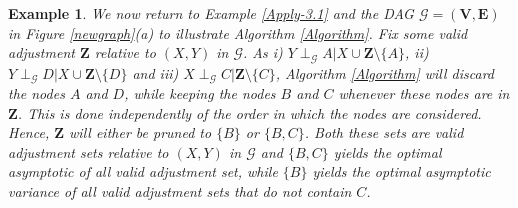 \documentclass[11pt,a4paper]{article}
\newtheorem{Example}[Satz]{Example}
\theoremstyle{definition}
\theoremstyle{remark}
\newcommand{\g}[1][G]{\mathcal{#1}}
\begin{document}

\begin{Example}
	
	We now return to Example \ref{Apply-3.1} and the DAG $\g = (\mathbf{V},\mathbf{E})$ in Figure \ref{newgraph}(a) to illustrate Algorithm \ref{Algorithm}. Fix some valid adjustment $\mathbf{Z}$ relative to $(X,Y)$ in $\g$. As i) $Y \perp_{\g} A | X \cup \mathbf{Z} \setminus \{A\}$, ii) $Y \perp_{\g} D | X \cup \mathbf{Z} \setminus \{D\}$  and iii) $X \perp_{\g} C | \mathbf{Z} \setminus \{C\}$, Algorithm \ref{Algorithm} will discard the nodes $A$ and $D$, while keeping the nodes $B$ and $C$ whenever these nodes are in $\mathbf{Z}$. This is done independently of the order in which the nodes are considered. Hence, $\mathbf{Z}$ will either be pruned to $\{B\}$ or $\{B,C\}$. Both these sets are valid adjustment sets relative to $(X,Y)$ in $\g$ and $\{B,C\}$ yields the optimal asymptotic of all valid adjustment set, while $\{B\}$ yields the optimal asymptotic variance of all valid adjustment sets that do not contain $C$.
	
	\label{ex:pruning}
	
\end{Example}

\end{document}

